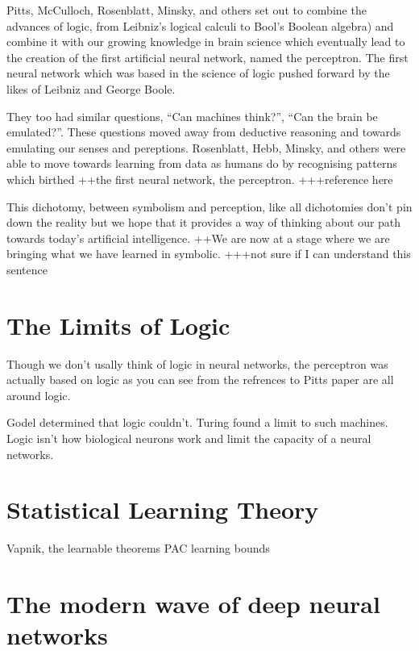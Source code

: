 \documentclass[]{book}
\theoremstyle{definition}
\theoremstyle{definition}
\theoremstyle{definition}
\theoremstyle{remark}
\begin{document}
Pitts, McCulloch, Rosenblatt, Minsky, and others set out to combine the
advances of logic, from Leibniz's logical calculi to Bool's Boolean
algebra) and combine it with our growing knowledge in brain science
which eventually lead to the creation of the first artificial neural
network, named the perceptron. The first neural network which was based
in the science of logic pushed forward by the likes of Leibniz and
George Boole.

They too had similar questions, ``Can machines think?'', ``Can the brain
be emulated?''. These questions moved away from deductive reasoning and
towards emulating our senses and pereptions. Rosenblatt, Hebb, Minsky,
and others were able to move towards learning from data as humans do by
recognising patterns which birthed ++the first neural network, the
perceptron. +++reference here

This dichotomy, between symbolism and perception, like all dichotomies
don't pin down the reality but we hope that it provides a way of
thinking about our path towards today's artificial intelligence. ++We
are now at a stage where we are bringing what we have learned in
symbolic. +++not sure if I can understand this sentence

\section{The Limits of Logic}\label{the-limits-of-logic}

Though we don't usally think of logic in neural networks, the perceptron
was actually based on logic as you can see from the refrences to Pitts
paper are all around logic.

Godel determined that logic couldn't. Turing found a limit to such
machines. Logic isn't how biological neurons work and limit the capacity
of a neural networks.

\section{Statistical Learning Theory}\label{statistical-learning-theory}

Vapnik, the learnable theorems PAC learning bounds

\section{The modern wave of deep neural
networks}\label{the-modern-wave-of-deep-neural-networks}
\end{document}
